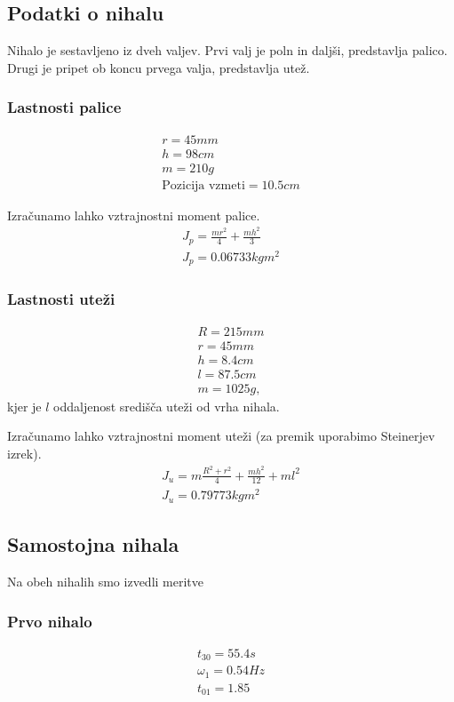 \documentclass[a4paper]{article}
\begin{document}
\subsection{Podatki o nihalu}
Nihalo je sestavljeno iz dveh valjev. Prvi valj je poln in daljši, predstavlja palico. Drugi je pripet ob koncu prvega valja, predstavlja utež.
\subsubsection{Lastnosti palice}
\begin{align*}
  r = 45mm\\
  h = 98cm\\
  m = 210g\\
  \text{Pozicija vzmeti} = 10.5cm
\end{align*}

Izračunamo lahko vztrajnostni moment palice.
\begin{align*}
  J_p = \frac{mr^2}{4}+\frac{mh^2}{3}\\
  J_p = 0.06733kgm^2
\end{align*}
\subsubsection{Lastnosti uteži}
\begin{align*}
  R = 215mm\\
  r = 45mm\\
  h = 8.4cm\\
  l = 87.5cm\\
  m = 1025g,
\end{align*}
kjer je $l$ oddaljenost središča uteži od vrha nihala.

Izračunamo lahko vztrajnostni moment uteži (za premik uporabimo Steinerjev izrek).
\begin{align*}
  J_u = m\frac{R^2+r^2}{4} + \frac{mh^2}{12} + ml^2\\
  J_u = 0.79773kgm^2
\end{align*}
\subsection{Samostojna nihala}
Na obeh nihalih smo izvedli meritve
\subsubsection{Prvo nihalo}
\begin{align*}
  t_{30} = 55.4s\\
  \omega_1 = 0.54 Hz\\
  t_{01} = 1.85
\end{align*}
\end{document}
